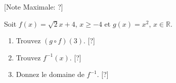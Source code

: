 \begin{question}
  \hspace*{\fill} [Note Maximale: ?]\par
  \medskip
  \noindent Soit $f(x) = \sqrt{2}{x + 4}$, $ x \ge - 4$ et $g(x) = x^2$, $x \in \mathbb{R}$.\par
  \begin{enumerate}[label=(\alph*)]
    \item Trouvez $(g \circ f)(3)$.\hspace*{\fill} [?]
    \item Trouvez $f^{-1}(x)$.\hspace*{\fill} [?]
    \item Donnez le domaine de $f^{-1}$.\hspace*{\fill} [?]
  \end{enumerate}
\end{question}

